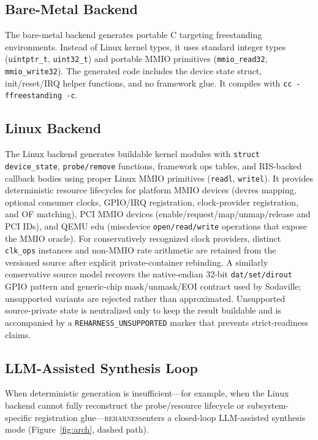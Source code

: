 \documentclass[sigconf,review]{acmart}
\newcommand{\reharness}{\textsc{reharness}}
\begin{document}
\subsection{Bare-Metal Backend}

The bare-metal backend generates portable C targeting freestanding environments. Instead of Linux kernel types, it uses standard integer types (\texttt{uintptr\_t}, \texttt{uint32\_t}) and portable MMIO primitives (\texttt{mmio\_read32}, \texttt{mmio\_write32}). The generated code includes the device state struct, init/reset/IRQ helper functions, and no framework glue. It compiles with \texttt{cc -ffreestanding -c}.

\subsection{Linux Backend}

The Linux backend generates buildable kernel modules with \texttt{struct device\_state}, \texttt{probe/remove} functions, framework ops tables, and RIS-backed callback bodies using proper Linux MMIO primitives (\texttt{readl}, \texttt{writel}). It provides deterministic resource lifecycles for platform MMIO devices (devres mapping, optional consumer clocks, GPIO/IRQ registration, clock-provider registration, and OF matching), PCI MMIO devices (enable/request/map/unmap/release and PCI IDs), and QEMU edu (miscdevice \texttt{open/read/write} operations that expose the MMIO oracle). For conservatively recognized clock providers, distinct \texttt{clk\_ops} instances and non-MMIO rate arithmetic are retained from the versioned source after explicit private-container rebinding. A similarly conservative source model recovers the native-endian 32-bit \texttt{dat/set/dirout} GPIO pattern and generic-chip mask/unmask/EOI contract used by Sodaville; unsupported variants are rejected rather than approximated. Unsupported source-private state is neutralized only to keep the result buildable and is accompanied by a \texttt{REHARNESS\_UNSUPPORTED} marker that prevents strict-readiness claims.

\subsection{LLM-Assisted Synthesis Loop}

When deterministic generation is insufficient---for example, when the Linux backend cannot fully reconstruct the probe/resource lifecycle or subsystem-specific registration glue---\reharness enters a closed-loop LLM-assisted synthesis mode (Figure~\ref{fig:arch}, dashed path).
\end{document}
